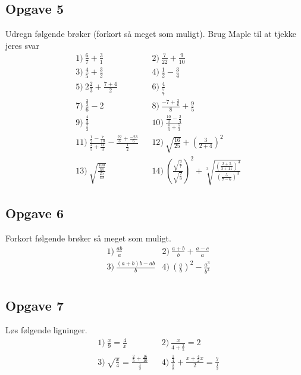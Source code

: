 \documentclass[12pt]{article}
\begin{document}
\subsection*{Opgave 5}
Udregn følgende brøker (forkort så meget som muligt). Brug Maple til at tjekke jeres svar
\begin{align*}
	&1)\  \frac{6}{7} + \frac{3}{1}            &&2)\ \frac{7}{22} + \frac{9}{10}\\
 	&3)\ \frac{4}{5} + \frac{3}{2}      &&4)\ \frac{1}{2} - \frac{3}{4}\\
 	&5)\  2\frac{2}{3} + \frac{7+4}{2}              &&6)\ \frac{4}{\frac{5}{7}}\\
 	&7)\  \frac{\frac{2}{3}}{6} - 2           &&8)\ \frac{-7+\frac{2}{6}}{8} + \frac{9}{5}\\
	&9)\ \frac{\frac{4}{3}}{\frac{2}{3}} &&10)\ \frac{\frac{10}{3}-\frac{2}{4}}{\frac{4}{3}+\frac{5}{3}} \\
	&11)\  \frac{\frac{1}{2}-\frac{7}{10}}{\frac{2}{5}+\frac{11}{3}} -  \frac{\frac{22}{3}+ \frac{-23}{6}}{\frac{1}{2}}        &&12)\ \sqrt{\frac{16}{25}} + \left(\frac{3}{2+4}\right)^2\\
	&13)\ \sqrt{\frac{\frac{100}{36}}{\frac{25}{49}}} && 14) \   \left(\frac{\sqrt{\frac{5}{7}}}{\sqrt{\frac{2}{9}}}\right)^2 + \sqrt[3]{\frac{\left(\frac{2+5}{3+11}\right)^3}{\left( \frac{5}{7-6}\right)^3}}
\end{align*}

\subsection*{Opgave 6}
Forkort følgende brøker så meget som muligt. 
\begin{align*}
	&1) \ \frac{ab}{a}   &2) \  \frac{a+b}{b} + \frac{a-c}{a}    \\
	&3) \ \frac{(a+b)b-ab}{b}   &4) \  \left(\frac{a}{b}\right)^2 - \frac{a^3}{b^3}   \\
\end{align*}

\subsection*{Opgave 7}
Løs følgende ligninger.
\begin{align*}
	&1) \ \frac{x}{9} = \frac{4}{x}   &&2) \ \frac{x}{4+\frac{2}{5}} = 2     \\
	&3) \ \sqrt{\frac{x}{4}} = \frac{\frac{2}{5}+\frac{16}{10}}{\frac{1}{2}}    &&4) \ \frac{\frac{1}{4}}{\frac{1}{8}} + \frac{x+\frac{4}{2}x}{2} = \frac{7}{\frac{1}{2}}    \\
\end{align*}
\end{document}
